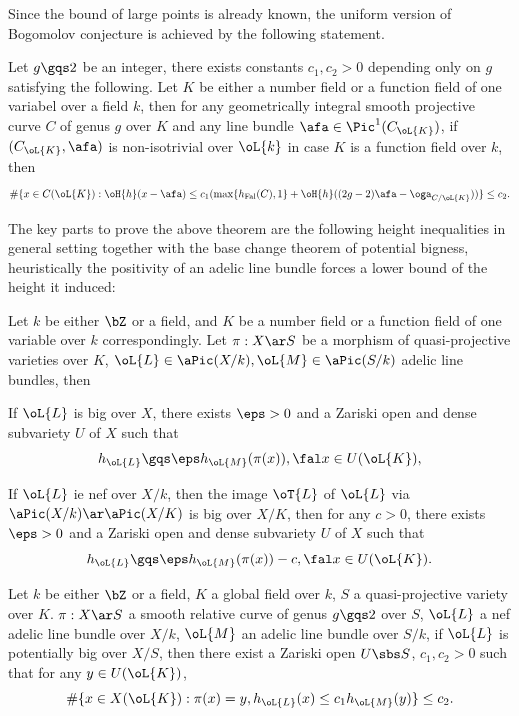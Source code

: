 \documentclass[a4paper, twoside]{article}
\begin{document}
Since the bound of large points is already known, the uniform version of Bogomolov conjecture is achieved by the following statement.
\begin{thm}[Theorem~4.6]
	Let $g\gqs2$ be an integer, there exists constants $c_{1},c_{2}>0$ depending only on $g$ satisfying the following. Let $K$ be either a number field or a function field of one variabel over a field $k$, then for any geometrically integral smooth projective curve $C$ of genus $g$ over $K$ and any line bundle $\afa\in\Pic^{1}(C_{\oL{K}})$, if $(C_{\oL{K}},\afa)$ is non-isotrivial over $\oL{k}$ in case $K$ is a function field over $k$, then
	\[
		\#\{x\in C(\oL{K}):\oH{h}(x-\afa)\leq c_{1}(\max\{h_{\mathrm{Fal}}(C),1\}+\oH{h}((2g-2)\afa-\oga_{C/\oL{K}}))\}\leq c_{2}.
	\]
\end{thm}


The key parts to prove the above theorem are the following height inequalities in general setting together with the base change theorem of potential bigness, heuristically the positivity of an adelic line bundle forces a lower bound of the height it induced:
\begin{thm}[{\cite[Theorem~5.3.5]{YZ2021}}]
	Let $k$ be either $\bZ$ or a field, and $K$ be a number field or a function field of one variable over $k$ correspondingly. Let $\pi:X\ar S$ be a morphism of quasi-projective varieties over $K$, $\oL{L}\in\aPic(X/k),\oL{M}\in\aPic(S/k)$ adelic line bundles, then
	\begin{enr}
		\item If $\oL{L}$ is big over $X$, there exists $\eps>0$ and a Zariski open and dense subvariety $U$ of $X$ such that
		\[
			h_{\oL{L}}\gqs\eps h_{\oL{M}}(\pi(x)), \fal x\in U(\oL{K}),
		\]
		\item If $\oL{L}$ ie nef over $X/k$, then the image $\oT{L}$ of $\oL{L}$ via $\aPic(X/k)\ar\aPic(X/K)$ is big over $X/K$, then for any $c>0$, there exists $\eps>0$ and a Zariski open and dense subvariety $U$ of $X$ such that
		\[
			h_{\oL{L}}\gqs\eps h_{\oL{M}}(\pi(x))-c, \fal x\in U(\oL{K}).
		\]
	\end{enr}
\end{thm}

\begin{thm}[Theorem~4.2]
	Let $k$ be either $\bZ$ or a field, $K$ a global field over $k$, $S$ a quasi-projective variety over $K$. $\pi:X\ar S$ a smooth relative curve of genus $g\gqs2$ over $S$, $\oL{L}$ a nef adelic line bundle over $X/k$, $\oL{M}$ an adelic line bundle over $S/k$, if $\oL{L}$ is potentially big over $X/S$, then there exist a Zariski open $U\sbs S$, $c_{1},c_{2}>0$ such that for any $y\in U(\oL{K})$,
	\[
		\#\{x\in X(\oL{K}):\pi(x)=y, h_{\oL{L}}(x)\leq c_{1}h_{\oL{M}}(y)\}\leq c_{2}.
	\]
\end{thm}
\end{document}

